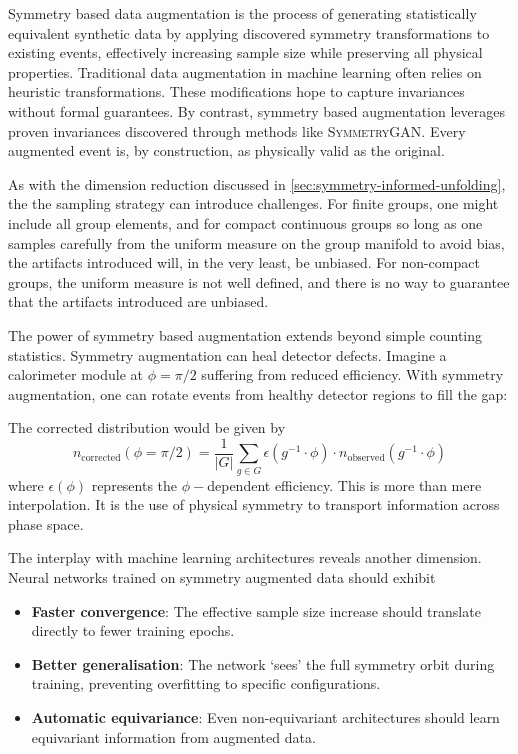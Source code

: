         Symmetry based data augmentation is the process of generating statistically equivalent synthetic data by applying discovered symmetry transformations to existing events, effectively increasing sample size while preserving all physical properties.
        Traditional data augmentation in machine learning often relies on heuristic transformations.
        These modifications hope to capture invariances without formal guarantees.
        By contrast, symmetry based augmentation leverages proven invariances discovered through methods like \textsc{SymmetryGAN}.
        Every augmented event is, by construction, as physically valid as the original.

        As with the dimension reduction discussed in \cref{sec:symmetry-informed-unfolding}, the the sampling strategy can introduce challenges.
        For finite groups, one might include all group elements, and for compact continuous groups so long as one samples carefully from the uniform measure on the group manifold to avoid bias, the artifacts introduced will, in the very least, be unbiased.
        For non-compact groups, the uniform measure is not well defined, and there is no way to guarantee that the artifacts introduced are unbiased.

        The power of symmetry based augmentation extends beyond simple counting statistics.
        Symmetry augmentation can heal detector defects.
        Imagine a calorimeter module at \(\phi = \pi/2\) suffering from reduced efficiency.
        With symmetry augmentation, one can rotate events from healthy detector regions to fill the gap:

        The corrected distribution would be given by
        \[
            n_{\text{corrected}}(\phi = \pi/2) = \frac{1}{|G|} \sum_{g \in G} \epsilon(g^{-1} \cdot \phi) \cdot n_{\text{observed}}(g^{-1} \cdot \phi)
        \]
        where \(\epsilon(\phi)\) represents the \(\phi-\)dependent efficiency.
        This is more than mere interpolation.
        It is the use of physical symmetry to transport information across phase space.

        The interplay with machine learning architectures reveals another dimension.
        Neural networks trained on symmetry augmented data should exhibit
        \begin{itemize}
            \item \textbf{Faster convergence}: The effective sample size increase should translate directly to fewer training epochs.
            \item \textbf{Better generalisation}: The network `sees' the full symmetry orbit during training, preventing overfitting to specific configurations.
            \item \textbf{Automatic equivariance}: Even non-equivariant architectures should learn equivariant information from augmented data.
        \end{itemize}
        
